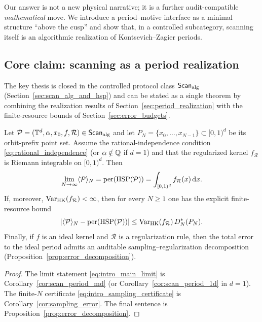 Our answer is not a new physical narrative; it is a further audit-compatible \emph{mathematical} move. We introduce a period--motive interface as a minimal structure ``above the cusp'' and show that, in a controlled subcategory, scanning itself is an algorithmic realization of Kontsevich--Zagier periods.

\subsection{Core claim: scanning as a period realization}
\label{sec:core_claim}

The key thesis is closed in the controlled protocol class $\mathsf{Scan}_{\mathrm{alg}}$ (Section~\ref{sec:scan_alg_and_hsp}) and can be stated as a single theorem by combining the realization results of Section~\ref{sec:period_realization} with the finite-resource bounds of Section~\ref{sec:error_budgets}.

\begin{theorem}
\label{thm:scan_realizes_period_intro}
Let $\mathcal{P}=(\mathbb{T}^d,\alpha,x_0,f,\mathcal{R})\in\mathsf{Scan}_{\mathrm{alg}}$ and let $P_N=\{x_0,\dots,x_{N-1}\}\subset[0,1)^d$ be its orbit-prefix point set. Assume the rational-independence condition \eqref{eq:rational_independence} (or $\alpha\notin\mathbb{Q}$ if $d=1$) and that the regularized kernel $f_{\mathcal{R}}$ is Riemann integrable on $[0,1)^d$. Then
\begin{equation}
\label{eq:intro_main_limit}
\lim_{N\to\infty}\langle \mathcal{P} \rangle_N
=
\mathrm{per}(\mathrm{HSP}(\mathcal{P}))
=
\int_{[0,1)^d} f_{\mathcal{R}}(x)\,\mathrm{d} x.
\end{equation}
If, moreover, $\mathrm{Var}_{\mathrm{HK}}(f_{\mathcal{R}})<\infty$, then for every $N\ge 1$ one has the explicit finite-resource bound
\begin{equation}
\label{eq:intro_sampling_certificate}
\left|\langle \mathcal{P} \rangle_N-\mathrm{per}(\mathrm{HSP}(\mathcal{P}))\right|
\le
\mathrm{Var}_{\mathrm{HK}}(f_{\mathcal{R}})\,D_N^\ast(P_N).
\end{equation}
Finally, if $f$ is an ideal kernel and $\mathcal{R}$ is a regularization rule, then the total error to the ideal period admits an auditable sampling--regularization decomposition (Proposition~\ref{prop:error_decomposition}).
\end{theorem}

\begin{proof}
The limit statement \eqref{eq:intro_main_limit} is Corollary~\ref{cor:scan_period_md} (or Corollary~\ref{cor:scan_period_1d} in $d=1$). The finite-$N$ certificate \eqref{eq:intro_sampling_certificate} is Corollary~\ref{cor:sampling_error}. The final sentence is Proposition~\ref{prop:error_decomposition}.
\end{proof}

